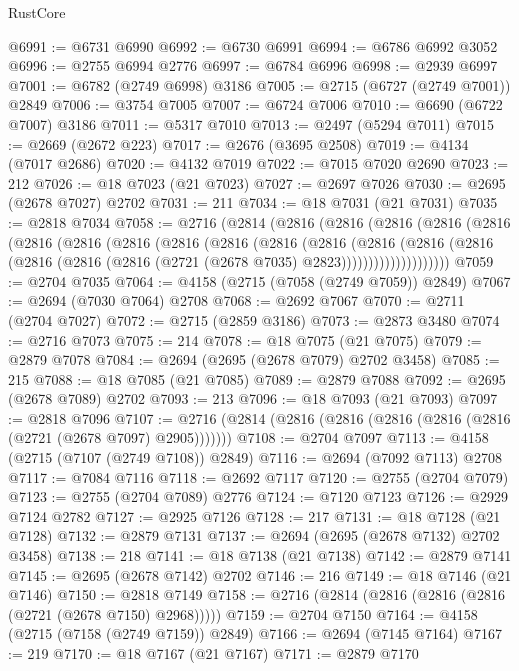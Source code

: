 \begin{lexlean}{RustCore}
\begin{coremodule}
@6991 := @6731 @6990
@6992 := @6730 @6991
@6994 := @6786 @6992 @3052
@6996 := @2755 @6994 @2776
@6997 := @6784 @6996
@6998 := @2939 @6997
@7001 := @6782 (@2749 @6998) @3186
@7005 := @2715 (@6727 (@2749 @7001)) @2849
@7006 := @3754 @7005
@7007 := @6724 @7006
@7010 := @6690 (@6722 @7007) @3186
@7011 := @5317 @7010
@7013 := @2497 (@5294 @7011)
@7015 := @2669 (@2672 @223)
@7017 := @2676 (@3695 @2508)
@7019 := @4134 (@7017 @2686)
@7020 := @4132 @7019
@7022 := @7015 @7020 @2690
@7023 := 212
@7026 := @18 @7023 (@21 @7023)
@7027 := @2697 @7026
@7030 := @2695 (@2678 @7027) @2702
@7031 := 211
@7034 := @18 @7031 (@21 @7031)
@7035 := @2818 @7034
@7058 := @2716
    (@2814
      (@2816
        (@2816
          (@2816
            (@2816
              (@2816
                (@2816
                  (@2816
                    (@2816
                      (@2816
                        (@2816
                          (@2816
                            (@2816
                              (@2816
                                (@2816
                                  (@2816
                                    (@2816
                                      (@2816 (@2816 (@2721 (@2678 @7035) @2823))))))))))))))))))))
@7059 := @2704 @7035
@7064 := @4158 (@2715 (@7058 (@2749 @7059)) @2849)
@7067 := @2694 (@7030 @7064) @2708
@7068 := @2692 @7067
@7070 := @2711 (@2704 @7027)
@7072 := @2715 (@2859 @3186)
@7073 := @2873 @3480
@7074 := @2716 @7073
@7075 := 214
@7078 := @18 @7075 (@21 @7075)
@7079 := @2879 @7078
@7084 := @2694 (@2695 (@2678 @7079) @2702 @3458)
@7085 := 215
@7088 := @18 @7085 (@21 @7085)
@7089 := @2879 @7088
@7092 := @2695 (@2678 @7089) @2702
@7093 := 213
@7096 := @18 @7093 (@21 @7093)
@7097 := @2818 @7096
@7107 := @2716 (@2814 (@2816 (@2816 (@2816 (@2816 (@2816 (@2721 (@2678 @7097) @2905)))))))
@7108 := @2704 @7097
@7113 := @4158 (@2715 (@7107 (@2749 @7108)) @2849)
@7116 := @2694 (@7092 @7113) @2708
@7117 := @7084 @7116
@7118 := @2692 @7117
@7120 := @2755 (@2704 @7079)
@7123 := @2755 (@2704 @7089) @2776
@7124 := @7120 @7123
@7126 := @2929 @7124 @2782
@7127 := @2925 @7126
@7128 := 217
@7131 := @18 @7128 (@21 @7128)
@7132 := @2879 @7131
@7137 := @2694 (@2695 (@2678 @7132) @2702 @3458)
@7138 := 218
@7141 := @18 @7138 (@21 @7138)
@7142 := @2879 @7141
@7145 := @2695 (@2678 @7142) @2702
@7146 := 216
@7149 := @18 @7146 (@21 @7146)
@7150 := @2818 @7149
@7158 := @2716 (@2814 (@2816 (@2816 (@2816 (@2721 (@2678 @7150) @2968)))))
@7159 := @2704 @7150
@7164 := @4158 (@2715 (@7158 (@2749 @7159)) @2849)
@7166 := @2694 (@7145 @7164)
@7167 := 219
@7170 := @18 @7167 (@21 @7167)
@7171 := @2879 @7170

\end{coremodule}
\end{lexlean}
